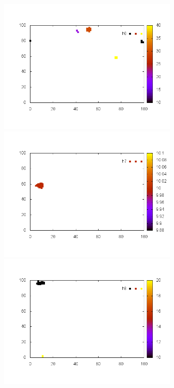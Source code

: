 \documentclass[10pt,a4paper]{article}
\begin{document}
\begin{figure}
\begin{subfigure}[b]{1\textwidth}
\includegraphics[scale=.3]{./img/SCC_Stable3/cut90p/6.png}
\includegraphics[scale=.3]{./img/SCC_Stable3/cut90p/7.png}
\includegraphics[scale=.3]{./img/SCC_Stable3/cut90p/8.png}

\end{subfigure}
\end{figure}
\end{document}
